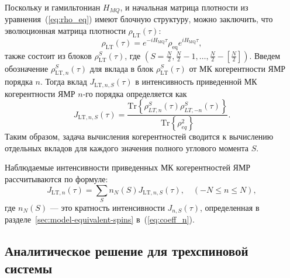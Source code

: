 Поскольку и гамильтониан $H_{MQ}$, и начальная матрица плотности из уравнения~(\ref{eq:rho_eq}) имеют блочную структуру,
можно заключить,
что эволюционная матрица плотности $\rho_\mathrm{LT}(\tau)$:
%
\begin{equation}
  \label{eq:rho_eval_lt}
  \rho_\mathrm{LT} (\tau) = e^{-iH_\mathrm{MQ}\tau} \rho_\mathrm{eq} e^{iH_\mathrm{MQ}\tau},
\end{equation}
%
также состоит из блоков $\rho^S_\mathrm{LT}(\tau)$,
где $(S=\frac N 2, \frac N 2 - 1, \dots, \frac N 2 - \left[\frac N 2\right])$.
Введем обозначение $\rho^S_{\mathrm{LT}, n}(\tau)$ для
вклада в блок $\rho^S_\mathrm{LT}(\tau)$ от МК когерентности ЯМР порядка $n$.
Тогда вклад $J_{\mathrm{LT}, n, S}(\tau)$ в интенсивность приведенной МК когерентности ЯМР $n$-го порядка определяется как
%
\begin{equation}
    \label{eq:coherence_k_s}
    J_{\mathrm{LT}, n, S}(\tau) = \dfrac{\mathrm{Tr}\left\{
        \rho_{LT, n}^S(\tau)\rho_{LT, -n}^S(\tau)
    \right\}}
    {\mathrm{Tr}\left\{\rho^2_{eq}\right\}}.
\end{equation}
%
Таким образом, задача вычисления когерентностей сводится к вычислению отдельных вкладов для каждого значения полного углового момента $S$.

Наблюдаемые интенсивности приведенных МК когерентностей ЯМР рассчитываются по формуле:
%
\begin{equation}\label{eq:coherence_k}
  J_{\mathrm{LT}, n}(\tau) = \sum\limits_S n_N(S) J_{\mathrm{LT}, n, S}(\tau),
  \quad
  (-N\leq n \leq N),
\end{equation}
%
где $n_N(S)$ --- это кратность интенсивности $J_{n, S}(\tau)$,
определенная в разделе~\ref{sec:model-equivalent-spins} в~(\ref{eq:coeff_n}).


\subsection{Аналитическое решение для трехспиновой системы}
\label{sec:sec:nanopora-thermodynamic-equilibrium-exact_sol}


